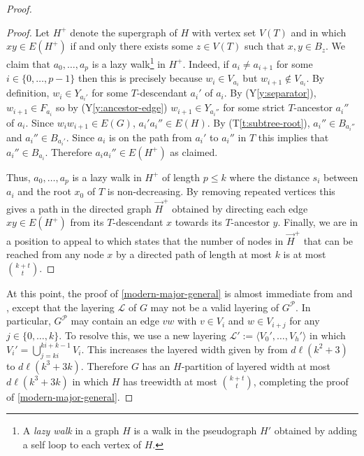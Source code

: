 \documentclass{patmorin}
\newcommand{\tref}[1]{(T\ref{t:#1})}
\newcommand{\yref}[1]{(Y\ref{y:#1})}
\renewcommand{\le}{\leqslant}
\begin{document}
\begin{proof}
\begin{proof}
  Let $H^+$ denote the supergraph of $H$ with vertex set $V(T)$ and in which $xy\in E(H^+)$ if and only there exists some $z\in V(T)$ such that $x,y\in B_z$. 
  We claim that $a_0,\ldots,a_p$ is a lazy walk\footnote{A \emph{lazy walk} in a graph $H$ is a walk in the pseudograph $H'$ obtained by adding a self loop to each vertex of $H$.} in $H^+$.  Indeed, if $a_i\neq a_{i+1}$ for some $i\in\{0,\ldots,p-1\}$ then this is precisely because $w_i\in V_{a_i}$ but $w_{i+1}\not\in V_{a_i}$.  By definition, $w_i\in Y_{a_i'}$ for some $T$-descendant $a_i'$ of $a_i$.
  By \yref{separator}, $w_{i+1}\in F_{a_i}$ so by \yref{ancestor-edge} $w_{i+1}\in Y_{a_i''}$ for some strict $T$-ancestor $a_i''$ of $a_i$.  Since $w_iw_{i+1}\in E(G)$, $a_i'a_i''\in E(H)$.  By \tref{subtree-root}, $a_i''\in B_{a_i''}$ and $a_i''\in B_{a_i'}$.  Since $a_i$ is on the path from $a_i'$ to $a_i''$ in $T$ this implies that $a_i''\in B_{a_i}$.  Therefore $a_ia_i''\in E(H^+)$ as claimed.
  
  Thus, $a_0,\ldots,a_p$ is a lazy walk in $H^+$ of length $p\le k$ where the distance $s_i$ between $a_i$ and the root $x_0$ of $T$ is non-decreasing.  By removing repeated vertices this gives a path in the directed graph $\overrightarrow{H}^+$ obtained by directing each edge $xy\in E(H^+)$ from its $T$-descendant $x$ towards its $T$-ancestor $y$. 
  Finally, we are in a position to appeal to \cite[Lemma~24]{pilipczuk.siebertz:polynomial-arxiv} which states that the number of nodes in $\overrightarrow{H}^+$ that can be reached from any node $x$ by a directed path of length at most $k$ is at most $\binom{k+t}{t}$.
\end{proof}


  At this point, the proof of \cref{modern-major-general} is almost immediate from  and , except that the layering $\mathcal{L}$ of $G$ may not be a valid layering of $G^{\mathcal{P}}$.  In particular, $G^{\mathcal{P}}$ may contain an edge $vw$ with $v\in V_i$ and $w\in V_{i+j}$ for any $j\in\{0,\ldots,k\}$.  To resolve this, we use a new layering $\mathcal{L}':=\langle V_0',\ldots,V_h'\rangle$ in which $V_i'=\bigcup_{j=ki}^{ki+k-1} V_i$.  This increases the layered width given by  from $d\ell(k^2+3)$ to $d\ell(k^3+3k)$.  Therefore $G$ has an $H$-partition of layered width at most $d\ell(k^3+3k)$ in which $H$ has treewidth at most $\binom{k+t}{t}$, completing the proof of \cref{modern-major-general}.
\end{proof}
\end{document}
